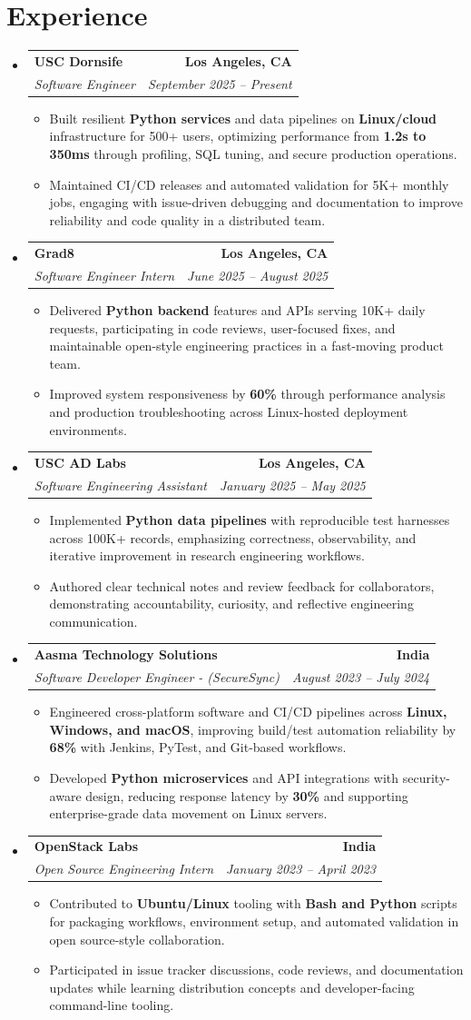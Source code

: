 \documentclass[letterpaper,10pt]{article}
\makeatletter
\newcommand{\resumeItem}[1]{\item\small{{#1 \vspace{-2pt}}}}
\newcommand{\resumeSubheading}[4]{\vspace{-1pt}\item\begin{tabular*}{1.0\textwidth}[t]{l@{\extracolsep{\fill}}r}\textbf{#1} & \textbf{\small #2} \\\textit{\small#3} & \textit{\small #4} \\\end{tabular*}\vspace{-2pt}}
\newcommand{\resumeSubHeadingListStart}{\begin{itemize}[leftmargin=0.0in, label={}]}
\newcommand{\resumeSubHeadingListEnd}{\end{itemize}}
\newcommand{\resumeItemListStart}{\begin{itemize}[leftmargin=0.15in,label=\textbullet,itemsep=2pt,topsep=0pt,parsep=0pt,partopsep=0pt]}
\newcommand{\resumeItemListEnd}{\end{itemize}\vspace{-4pt}}
\makeatother
\begin{document}
\section{Experience}
\resumeSubHeadingListStart
\resumeSubheading{USC Dornsife}{Los Angeles, CA}{Software Engineer}{September 2025 -- Present}
\resumeItemListStart
\resumeItem{Built resilient \textbf{Python services} and data pipelines on \textbf{Linux/cloud} infrastructure for 500+ users, optimizing performance from \textbf{1.2s to 350ms} through profiling, SQL tuning, and secure production operations.}
\resumeItem{Maintained CI/CD releases and automated validation for 5K+ monthly jobs, engaging with issue-driven debugging and documentation to improve reliability and code quality in a distributed team.}
\resumeItemListEnd
\resumeSubheading{Grad8}{Los Angeles, CA}{Software Engineer Intern}{June 2025 -- August 2025}
\resumeItemListStart
\resumeItem{Delivered \textbf{Python backend} features and APIs serving 10K+ daily requests, participating in code reviews, user-focused fixes, and maintainable open-style engineering practices in a fast-moving product team.}
\resumeItem{Improved system responsiveness by \textbf{60\%} through performance analysis and production troubleshooting across Linux-hosted deployment environments.}
\resumeItemListEnd
\resumeSubheading{USC AD Labs}{Los Angeles, CA}{Software Engineering Assistant}{January 2025 -- May 2025}
\resumeItemListStart
\resumeItem{Implemented \textbf{Python data pipelines} with reproducible test harnesses across 100K+ records, emphasizing correctness, observability, and iterative improvement in research engineering workflows.}
\resumeItem{Authored clear technical notes and review feedback for collaborators, demonstrating accountability, curiosity, and reflective engineering communication.}
\resumeItemListEnd
\resumeSubheading{Aasma Technology Solutions}{India}{Software Developer Engineer - (SecureSync)}{August 2023 -- July 2024}
\resumeItemListStart
\resumeItem{Engineered cross-platform software and CI/CD pipelines across \textbf{Linux, Windows, and macOS}, improving build/test automation reliability by \textbf{68\%} with Jenkins, PyTest, and Git-based workflows.}
\resumeItem{Developed \textbf{Python microservices} and API integrations with security-aware design, reducing response latency by \textbf{30\%} and supporting enterprise-grade data movement on Linux servers.}
\resumeItemListEnd
\resumeSubheading{OpenStack Labs}{India}{Open Source Engineering Intern}{January 2023 -- April 2023}
\resumeItemListStart
\resumeItem{Contributed to \textbf{Ubuntu/Linux} tooling with \textbf{Bash and Python} scripts for packaging workflows, environment setup, and automated validation in open source-style collaboration.}
\resumeItem{Participated in issue tracker discussions, code reviews, and documentation updates while learning distribution concepts and developer-facing command-line tooling.}
\resumeItemListEnd
\resumeSubHeadingListEnd
\vspace{-14pt}
\end{document}
